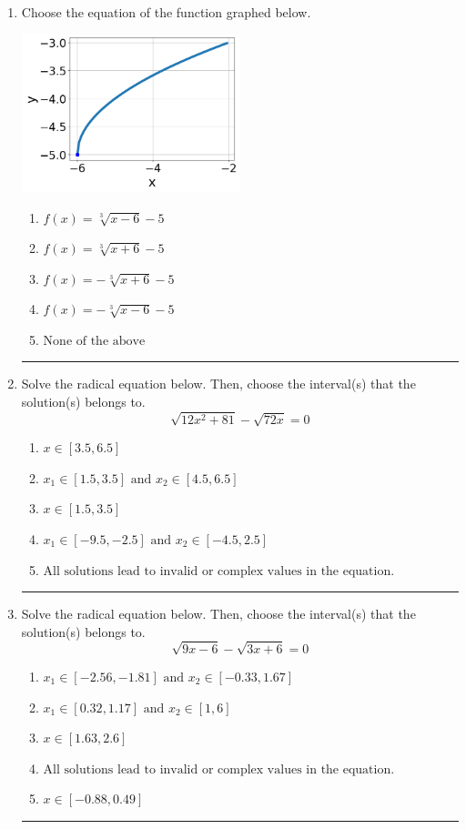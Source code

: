 \documentclass[14pt]{extbook}
\newcommand{\litem}[1]{\item#1\hspace*{-1cm}\rule{\textwidth}{0.4pt}}
\begin{document}
\begin{enumerate}
{\begin{enumerate}[label=\Alph*.]
\end{enumerate} }
\litem{
Choose the equation of the function graphed below.
\begin{center}
    \includegraphics[width=0.5\textwidth]{../Figures/radicalGraphToEquationCopyB.png}
\end{center}
\begin{enumerate}[label=\Alph*.]
\item \( f(x) = \sqrt[3]{x - 6} - 5 \)
\item \( f(x) = \sqrt[3]{x + 6} - 5 \)
\item \( f(x) = - \sqrt[3]{x + 6} - 5 \)
\item \( f(x) = - \sqrt[3]{x - 6} - 5 \)
\item \( \text{None of the above} \)

\end{enumerate} }
\litem{
Solve the radical equation below. Then, choose the interval(s) that the solution(s) belongs to.\[ \sqrt{12 x^2 + 81} - \sqrt{72 x} = 0 \]\begin{enumerate}[label=\Alph*.]
\item \( x \in [3.5,6.5] \)
\item \( x_1 \in [1.5, 3.5] \text{ and } x_2 \in [4.5,6.5] \)
\item \( x \in [1.5,3.5] \)
\item \( x_1 \in [-9.5, -2.5] \text{ and } x_2 \in [-4.5,2.5] \)
\item \( \text{All solutions lead to invalid or complex values in the equation.} \)

\end{enumerate} }
\litem{
Solve the radical equation below. Then, choose the interval(s) that the solution(s) belongs to.\[ \sqrt{9 x - 6} - \sqrt{3 x + 6} = 0 \]\begin{enumerate}[label=\Alph*.]
\item \( x_1 \in [-2.56, -1.81] \text{ and } x_2 \in [-0.33,1.67] \)
\item \( x_1 \in [0.32, 1.17] \text{ and } x_2 \in [1,6] \)
\item \( x \in [1.63,2.6] \)
\item \( \text{All solutions lead to invalid or complex values in the equation.} \)
\item \( x \in [-0.88,0.49] \)


\end{enumerate}}
\end{enumerate}
\end{document}
